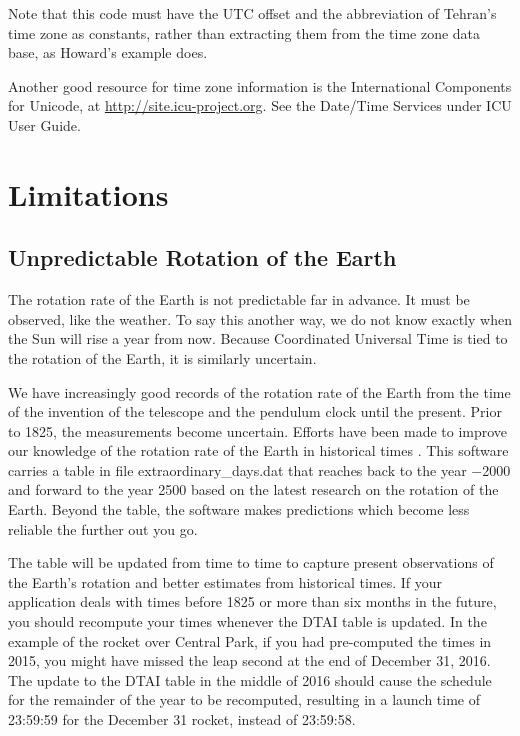\documentclass[letterpaper,twoside]{article}
\newcommand{\filename}{\ttfamily\smaller}
\begin{document}
\inputminted[firstline=27,lastline=90]{Python}{examples/example_07.py}

Note that this code must have the UTC offset and the abbreviation
of Tehran's time zone as constants, rather than extracting them
from the time zone data base, as Howard's example does.

Another good resource for time zone information is
the International Components for Unicode, at
\href{http://site.icu-project.org}{http://site.icu-project.org}.
See the Date/Time Services under ICU User Guide.

\section{Limitations}
\subsection{Unpredictable Rotation of the Earth}
The rotation rate of the Earth is not predictable far in advance.  It must
be observed, like the weather.  To say this another way, we do not know
exactly when the Sun will rise a year from now.  Because Coordinated
Universal Time is tied to the rotation of the Earth, it is similarly
uncertain.

We have increasingly good records of the rotation rate of the Earth
from the time
of the invention of the telescope and the pendulum clock until
the present.  Prior to \num{1825}, the measurements become uncertain.
Efforts have been made to improve our knowledge of the rotation
rate of the Earth in historical times\citep{2004JHA....35..327M}%
\citep{2005JHA....36..339M}\citep{1997A&A...322..347S}%
\citep{2011ASSP...23....3S}\citep{1986PEPI...44..281M}%
\citep{Stephenson20160404}.
This software carries a table in file {\filename extraordinary\_days.dat}
that reaches back to the year \num{-2000} and forward to
the year \num{2500} based on the latest research on the rotation
of the Earth.
Beyond the table, the software makes predictions which become less
reliable the further out you go.

The table will be updated from time to time to capture present
observations of the Earth's rotation and better estimates from
historical times.  If your application deals with times before
\num{1825} or more than six months in the future, you should recompute
your times whenever the DTAI table is updated.  In the example
of the rocket over Central Park, if you had pre-computed the times
in 2015, you might have missed the leap second at the end of
December 31, 2016.  The update to the DTAI table in the middle
of 2016 should cause the schedule for the remainder of the year
to be recomputed, resulting in a launch time of 23:59:59 for
the December 31 rocket, instead of 23:59:58.
\end{document}
